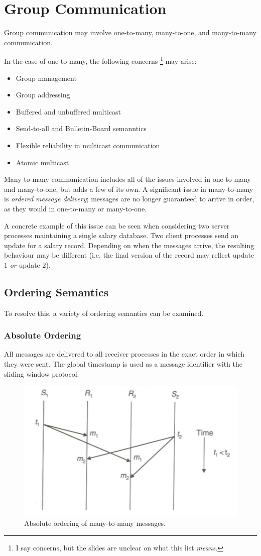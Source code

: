 \section{Group Communication}
Group communication may involve one-to-many, many-to-one, and many-to-many communication.

In the case of one-to-many, the following concerns \footnote{I say concerns, but the slides are unclear on what this list \textit{means}.} may arise: \begin{itemize}
\item Group management
\item Group addressing
\item Buffered and unbuffered multicast
\item Send-to-all and Bulletin-Board semanntics
\item Flexible reliability in multicast communication
\item Atomic multicast
\end{itemize}

Many-to-many communication includes all of the issues involved in one-to-many and many-to-one, but adds a few of its own. A significant issue in many-to-many is \textit{ordered message delivery}; messages are no longer guaranteed to arrive in order, as they would in one-to-many or many-to-one.

A concrete example of this issue can be seen when considering two server processes maintaining a single salary database. Two client processes send an update for a salary record. Depending on when the messages arrive, the resulting behaviour may be different (i.e. the final version of the record may reflect update 1 \textit{or} update 2).

\subsection{Ordering Semantics}
To resolve this, a variety of ordering semantics can be examined.

\subsubsection{Absolute Ordering}
All messages are delivered to all receiver processes in the exact order in which they were sent. The global timestamp is used as a message identifier with the sliding window protocol.

\begin{figure}[h]
\centering
\includegraphics[width=0.7\linewidth]{figures/screenshot020}
\caption{Absolute ordering of many-to-many messages.}
\label{fig:screenshot020}
\end{figure}

